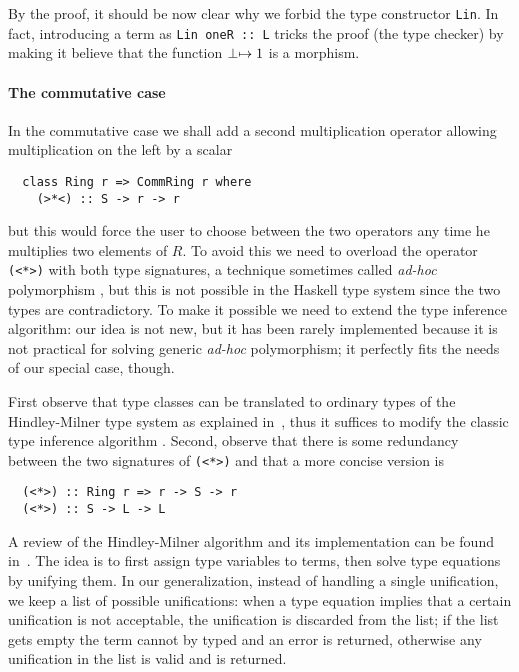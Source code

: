 By the proof, it should be now clear why we forbid the type
constructor \lstinline{Lin}. In fact, introducing a term as
\lstinline{Lin oneR :: L} tricks the proof (the type checker) by
making it believe that the function $\perp\mapsto 1$ is a morphism.


\paragraph{The commutative case}
\label{sec:commutative-case}
In the commutative case we shall add a second multiplication operator
allowing multiplication on the left by a scalar
\begin{lstlisting}
  class Ring r => CommRing r where
    (>*<) :: S -> r -> r 
\end{lstlisting}
but this would force the user to choose between the two operators any
time he multiplies two elements of $R$. To avoid this we need to
overload the operator \lstinline{(<*>)} with both type signatures, a
technique sometimes called \emph{ad-hoc} polymorphism
\cite{strachey00}, but this is not possible in the Haskell type system
since the two types are contradictory.  To make it possible we need to
extend the type inference algorithm: our idea is not new, but it has
been rarely implemented because it is not practical for solving
generic \emph{ad-hoc} polymorphism; it perfectly fits the needs of our
special case, though.

First observe that type classes can be translated to ordinary types of
the Hindley-Milner type system as explained in~\cite[$\S
4$]{Walder+Blott-ad-hoc-polymorphism}, thus it suffices to modify the
classic type inference algorithm
\cite{Damas+Milner,Cardelli:Typechecking}. Second, observe that there
is some redundancy between the two signatures of \lstinline{(<*>)} and
that a more concise version is
\begin{lstlisting}
  (<*>) :: Ring r => r -> S -> r
  (<*>) :: S -> L -> L
\end{lstlisting}

A review of the Hindley-Milner algorithm and its implementation can be
found in~\cite{Cardelli:Typechecking}. The idea is to first assign
type variables to terms, then solve type equations by unifying them.
In our generalization, instead of handling a single unification, we
keep a list of possible unifications: when a type equation implies
that a certain unification is not acceptable, the unification is
discarded from the list; if the list gets empty the term cannot by
typed and an error is returned, otherwise any unification in the list
is valid and is returned.

